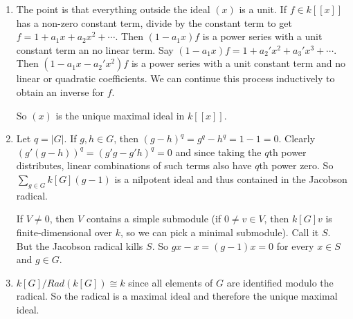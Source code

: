 \documentclass{article}
\begin{document}
\begin{enumerate}
   \item The point is that everything outside the ideal $(x)$ is a unit. If $f
      \in k[ [x] ]$ has a non-zero constant term, divide by the constant term to
      get $f = 1 + a_1x + a_2x^2+\dotsb$. Then $(1-a_1x)f$ is a power series
      with a unit constant term an no linear term. Say $(1-a_1x)f = 1 + a_2'x^2
      + a_3'x^3+\dotsb$. Then $(1-a_1x-a_2'x^2)f$ is a power series with a unit
      constant term and no linear or quadratic coefficients. We can continue
      this process inductively to obtain an inverse for $f$.

      So $(x)$ is the unique maximal ideal in $k[ [x] ]$.

   \item Let $q = |G|$. If $g,h \in G$, then $(g-h)^q = g^q-h^q = 1-1 = 0$.
      Clearly $(g'(g-h))^q = (g'g-g'h)^q = 0$ and since taking the $q$th power
      distributes, linear combinations of such terms also have $q$th power zero.
      So $\sum_{g \in G} k[G](g-1)$ is a nilpotent ideal and thus contained in
      the Jacobson radical.

      If $V \neq 0$, then $V$ contains a simple submodule (if $0 \neq v \in V$,
      then $k[G]v$ is finite-dimensional over $k$, so we can pick a minimal
      submodule). Call it $S$. But the Jacobson radical kills $S$. So $gx-x =
      (g-1)x = 0$ for every $x \in S$ and $g \in G$.

   \item $k[G]/Rad(k[G]) \cong k$ since all elements of $G$ are identified
      modulo the radical. So the radical is a maximal ideal and therefore the
      unique maximal ideal.
\end{enumerate}
\end{document}
